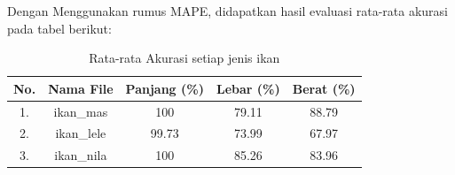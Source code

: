 
Dengan Menggunakan rumus MAPE, didapatkan hasil evaluasi rata-rata akurasi pada tabel berikut:

\begin{table}[H]
    \centering
    \begin{tabular}{|c|c|c|c|c|}
        \hline
        No. & Nama File & Panjang (\%) & Lebar (\%) & Berat (\%) \\
        \hline
        1. & ikan\_mas & 100 & 79.11 & 88.79 \\
        \hline
        2. & ikan\_lele & 99.73 & 73.99 & 67.97 \\
        \hline
        3. & ikan\_nila & 100 & 85.26 & 83.96 \\
        \hline
    \end{tabular}
\caption{Rata-rata Akurasi setiap jenis ikan}
\end{table}


